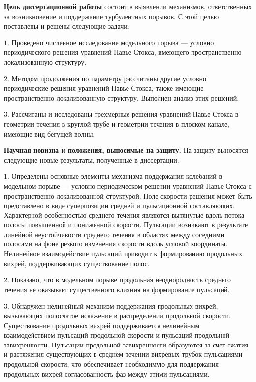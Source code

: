 {\bf Цель диссертационной работы} состоит в выявлении механизмов, ответственных за возникновение и поддержание турбулентных порывов. 
С этой целью поставлены и решены следующие задачи: 

\noindent $1.$ Проведено численное исследование модельного порыва --- условно периодического решения уравнений Навье-Стокса, имеющего пространственно-локализованную структуру. %

\noindent $2.$ Методом продолжения по параметру рассчитаны другие условно периодические решения уравнений Навье-Стокса, также имеющие пространственно локализованную структуру. Выполнен анализ этих решений. %

\noindent $3.$ Рассчитаны и исследованы трехмерные решения уравнений Навье-Стокса в геометрии течения в круглой трубе и геометрии течения в плоском канале, имеющие вид бегущей волны. %


{\bf Научная новизна и положения, выносимые на защиту.} На защиту выносятся следующие новые результаты, полученные в диссертации:

\noindent $1.$ Определены основные элементы механизма поддержания колебаний в модельном порыве --- условно периодическом решении уравнений Навье-Стокса с пространственно-локализованной структурой. Поле скорости решения может быть представлено в виде суперпозиции средней и пульсационной составляющих. Характерной особенностью среднего течения являются вытянутые вдоль потока полосы повышенной и пониженной скорости. Пульсации возникают в результате линейной неустойчивости среднего течения в областях между соседними полосами на фоне резкого изменения скорости вдоль угловой координаты. Нелинейное взаимодействие пульсаций приводит к формированию продольных вихрей, поддерживающих существование полос.

\noindent $2.$ Показано, что в модельном порыве продольная неоднородность среднего течения не оказывает существенного влияния на формирование пульсаций. 

\noindent $3.$ Обнаружен нелинейный механизм поддержания продольных вихрей, вызывающих полосчатое искажение в распределении продольной скорости. Существование продольных вихрей поддерживается нелинейным взаимодействием пульсаций продольной скорости и пульсаций продольной завихренности. Пульсации продольной завихренности образуются за счет сжатия и растяжения существующих в среднем течении вихревых трубок пульсациями продольной скорости, что обеспечивает необходимую для поддержания продольных вихрей согласованность фаз между этими пульсациями. 

